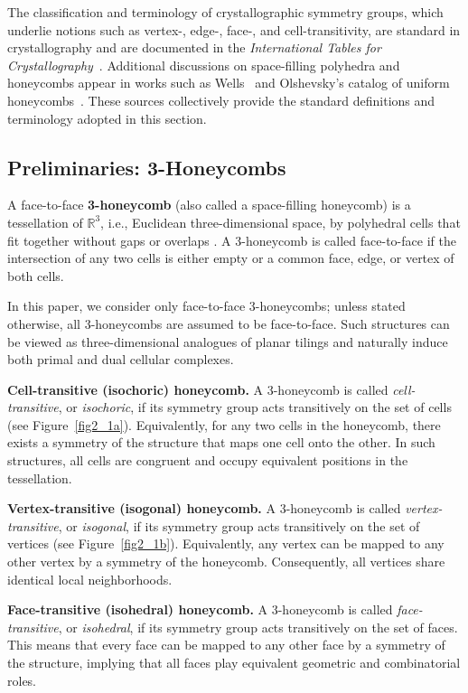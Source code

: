 \documentclass[times,twocolumn,final]{elsarticle}
\begin{document}
The classification and terminology of crystallographic symmetry groups, which underlie notions such as vertex-, edge-, face-, and cell-transitivity, are standard in crystallography and are documented in the \emph{International Tables for Crystallography}~\cite{hahn2005international}.
Additional discussions on space-filling polyhedra and honeycombs appear in works such as Wells~\cite{wells1963geometrical,wells1977three} and Olshevsky's catalog of uniform honeycombs~\cite{binnendyk2026uniform}.
These sources collectively provide the standard definitions and terminology adopted in this section.

\subsection{Preliminaries: 3-Honeycombs}

A face-to-face \textbf{3-honeycomb} (also called a space-filling honeycomb) is a tessellation of $\mathbb{R}^3$, i.e., Euclidean three-dimensional space, by polyhedral cells that fit together without gaps or overlaps \cite{grunbaum1969convex,grunbaum1987tilings}. A 3-honeycomb is called face-to-face if the intersection of any two cells is either empty or a common face, edge, or vertex of both cells. 

In this paper, we consider only face-to-face 3-honeycombs; unless stated otherwise, all 3-honeycombs are assumed to be face-to-face. Such structures can be viewed as three-dimensional analogues of planar tilings and naturally induce both primal and dual cellular complexes. 

\noindent \textbf{Cell-transitive (isochoric) honeycomb.}
A 3-honeycomb is called \emph{cell-transitive}, or \emph{isochoric}, if its symmetry group acts transitively on the set of cells (see Figure~\ref{fig2_1a}). Equivalently, for any two cells in the honeycomb, there exists a symmetry of the structure that maps one cell onto the other. In such structures, all cells are congruent and occupy equivalent positions in the tessellation.

\noindent \textbf{Vertex-transitive (isogonal) honeycomb.}
A 3-honeycomb is called \emph{vertex-transitive}, or \emph{isogonal}, if its symmetry group acts transitively on the set of vertices (see Figure~\ref{fig2_1b}). Equivalently, any vertex can be mapped to any other vertex by a symmetry of the honeycomb. Consequently, all vertices share identical local neighborhoods.

\noindent \textbf{Face-transitive (isohedral) honeycomb.}
A 3-honeycomb is called \emph{face-transitive}, or \emph{isohedral}, if its symmetry group acts transitively on the set of faces. This means that every face can be mapped to any other face by a symmetry of the structure, implying that all faces play equivalent geometric and combinatorial roles.
\end{document}
